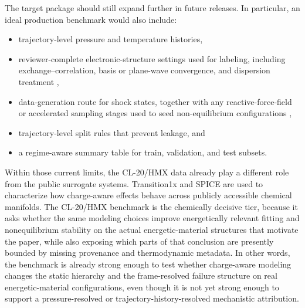 The target package should still expand further in future releases. In particular, an ideal production benchmark would also include:
\begin{itemize}
    \item trajectory-level pressure and temperature histories,
    \item reviewer-complete electronic-structure settings used for labeling, including exchange--correlation, basis or plane-wave convergence, and dispersion treatment \cite{perdew1996generalized,kresse1996efficient,grimme2010consistent},
    \item data-generation route for shock states, together with any reactive-force-field or accelerated sampling stages used to seed non-equilibrium configurations \cite{van2001reaxff},
    \item trajectory-level split rules that prevent leakage, and
    \item a regime-aware summary table for train, validation, and test subsets.
\end{itemize}

Within those current limits, the CL-20/HMX data already play a different role from the public surrogate systems. Transition1x and SPICE are used to characterize how charge-aware effects behave across publicly accessible chemical manifolds. The CL-20/HMX benchmark is the chemically decisive tier, because it asks whether the same modeling choices improve energetically relevant fitting and nonequilibrium stability on the actual energetic-material structures that motivate the paper, while also exposing which parts of that conclusion are presently bounded by missing provenance and thermodynamic metadata. In other words, the benchmark is already strong enough to test whether charge-aware modeling changes the static hierarchy and the frame-resolved failure structure on real energetic-material configurations, even though it is not yet strong enough to support a pressure-resolved or trajectory-history-resolved mechanistic attribution.
